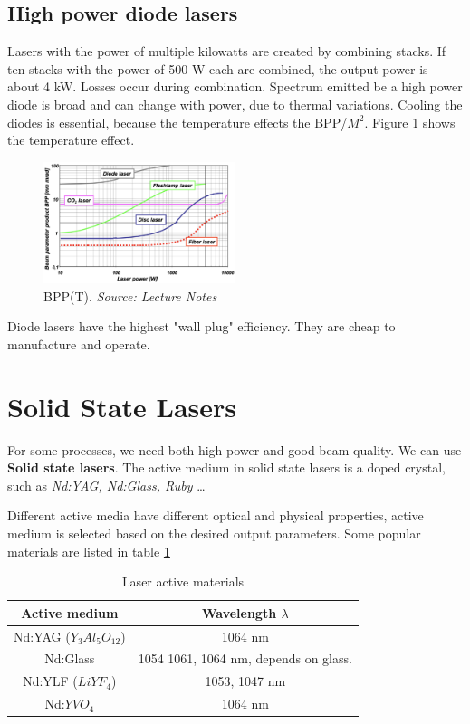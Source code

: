 \subsection{High power diode lasers}
Lasers with the power of multiple kilowatts are created by combining stacks. 
If ten stacks with the power of 500 W each are combined, the output power is about 4 kW. 
Losses occur during combination. Spectrum emitted be a high power diode is broad and can change with power, due to thermal variations.
Cooling the diodes is essential, because the temperature effects the BPP/$M^2$.
Figure \ref{fig:tef} shows the temperature effect. 
\begin{figure}[h!]
    \centering
    \includegraphics[width=0.5\textwidth]{slike/theffect.png}
    \caption{BPP(T). \textit{Source: Lecture Notes}}
    \label{fig:tef}
\end{figure}

Diode lasers have the highest "wall plug" efficiency. They are cheap to manufacture and operate.

\section{Solid State Lasers}

For some processes, we need both high power and good beam quality. We can use 
\textbf{Solid state lasers}. The active medium in solid state lasers is a doped crystal, such as 
\textit{Nd:YAG, Nd:Glass, Ruby} \dots

Different active media have different optical and physical properties, active medium
is selected based on the desired output parameters. Some popular materials are listed in table \ref{tab:lamssl}
\begin{table}[h!]
    \centering
    \begin{tabular}{|c|c|}
        \hline
        Active medium & Wavelength $\lambda$ \\
        \hline
        Nd:YAG ($Y_3Al_5O_{12}$) & 1064 nm \\
        \hline
        Nd:Glass & 1054 1061, 1064 nm, depends on glass.\\
        \hline
        Nd:YLF ($LiYF_4$) & 1053, 1047 nm \\
        \hline
        Nd:$YVO_4$ & 1064 nm \\
        \hline
    
    \end{tabular}
    \caption{Laser active materials}
    \label{tab:lamssl}
\end{table}

